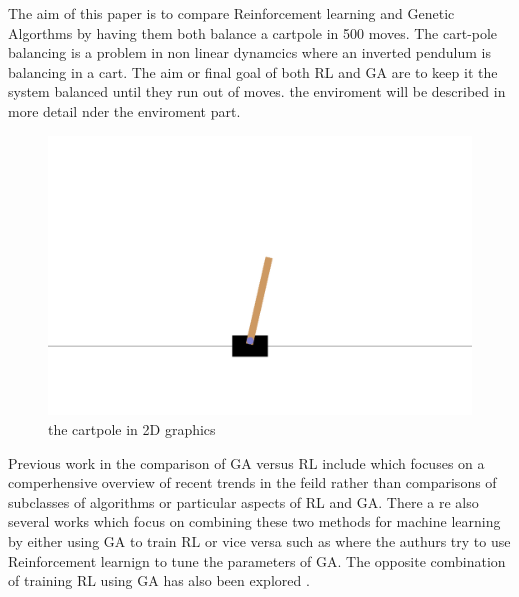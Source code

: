 The aim of this paper is to compare Reinforcement learning and Genetic Algorthms by having them both balance a cartpole in 500 moves. 
The cart-pole balancing is a problem in non linear dynamcics where an inverted pendulum is balancing in a cart. The aim or final goal of both RL and GA are to keep it the system balanced until they run out of moves. the enviroment will be described in more detail nder the enviroment part.  
\begin{figure}[H]
    \centering
    \includegraphics [scale = 0.18]{Images/cartpole.png}
    \caption{the cartpole in 2D graphics}
    \label{figPOLE}
\end{figure}
Previous work in the comparison of GA versus RL include \cite{drugan2019reinforcement} which focuses on a comperhensive overview of recent trends in the feild rather than comparisons of subclasses of algorithms or particular aspects of RL and GA. There a re also several works which focus on combining these two methods for machine learning by either using GA to train RL or vice versa such as \cite{eiben2007reinforcement} where the authurs try to use Reinforcement learnign to tune the parameters of GA. The opposite combination of training RL using GA has also been explored \cite{khadka2018evolutionary}.



